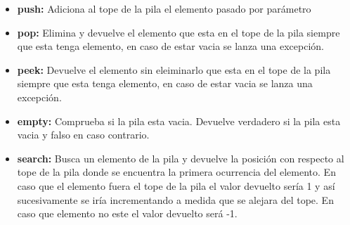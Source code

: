 \begin{itemize}
	\item {\bf push:} Adiciona al tope de la pila el elemento pasado por parámetro 
	
	\item {\bf pop:} Elimina y devuelve el elemento que esta en el tope de la pila siempre que esta tenga elemento, en caso de estar vacia se lanza una excepción.
	
	\item {\bf peek:} Devuelve el elemento sin eleiminarlo que esta en el tope de la pila siempre que esta tenga elemento, en caso de estar vacia se lanza una excepción.

	\item {\bf empty:} Comprueba si la pila esta vacia. Devuelve verdadero si la pila esta vacia y falso en caso contrario.
	
	\item {\bf search:} Busca un elemento de la pila y devuelve la posición con respecto al tope de la pila donde se encuentra la primera ocurrencia del elemento. En caso que el elemento fuera el tope de la pila el valor devuelto sería 1 y así sucesivamente se iría incrementando a medida que se alejara del tope. En caso que elemento no este el valor devuelto será -1.	
\end{itemize}

